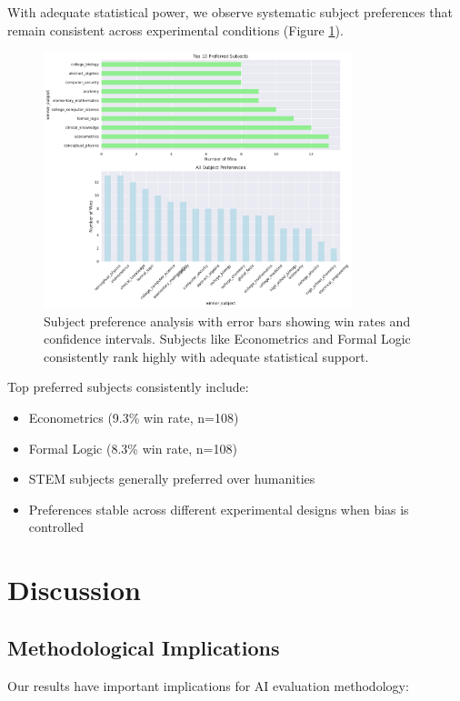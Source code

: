 \documentclass[11pt,a4paper]{article}
\begin{document}
With adequate statistical power, we observe systematic subject preferences that remain consistent across experimental conditions (Figure \ref{fig:subjects}).

\begin{figure}[h]
    \centering
    \includegraphics[width=0.8\textwidth]{figures/neutral_subject_preferences.pdf}
    \caption{Subject preference analysis with error bars showing win rates and confidence intervals. Subjects like Econometrics and Formal Logic consistently rank highly with adequate statistical support.}
    \label{fig:subjects}
\end{figure}

Top preferred subjects consistently include:
\begin{itemize}
    \item Econometrics (9.3\% win rate, n=108)
    \item Formal Logic (8.3\% win rate, n=108) 
    \item STEM subjects generally preferred over humanities
    \item Preferences stable across different experimental designs when bias is controlled
\end{itemize}

\section{Discussion}

\subsection{Methodological Implications}

Our results have important implications for AI evaluation methodology:
\end{document}

